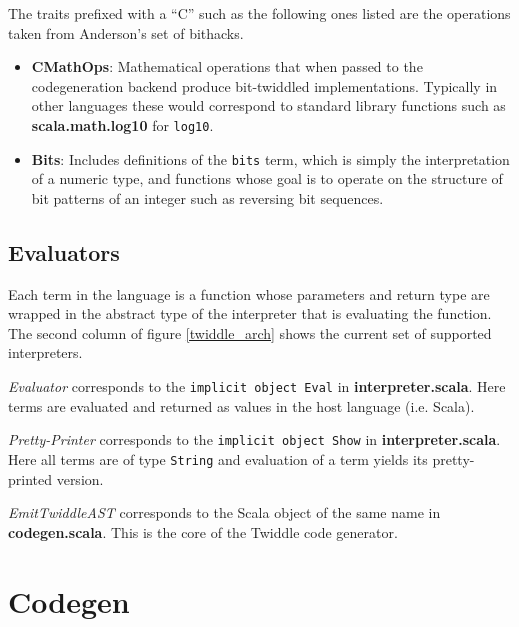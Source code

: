 \documentclass{article}
\begin{document}
The traits prefixed with a ``C'' such as the following ones listed are the operations taken from Anderson's set of bithacks\cite{anderson2005bit}.
\begin{itemize}
	\item \textbf{CMathOps}: Mathematical operations that when passed to the codegeneration backend produce bit-twiddled implementations. Typically in other languages these would correspond to standard library functions such as \textbf{scala.math.log10} for \texttt{log10}.
	\item \textbf{Bits}: Includes definitions of the \texttt{bits} term, which is simply the interpretation of a numeric type, and functions whose goal is to operate on the structure of bit patterns of an integer such as reversing bit sequences.
\end{itemize}

\subsection{Evaluators}
Each term in the language is a function whose parameters and return type are wrapped in the abstract type of the interpreter that is evaluating the function. The second column of figure \ref{twiddle_arch} shows the current set of supported interpreters.

\textit{Evaluator} corresponds to the \texttt{implicit object Eval} in \textbf{interpreter.scala}. Here terms are evaluated and returned as values in the host language (i.e. Scala).

\textit{Pretty-Printer} corresponds to the \texttt{implicit object Show} in \textbf{interpreter.scala}. Here all terms are of type \texttt{String} and evaluation of a term yields its pretty-printed version.

\textit{EmitTwiddleAST} corresponds to the Scala object of the same name in \textbf{codegen.scala}. This is the core of the Twiddle code generator.

\section{Codegen}
\end{document}

